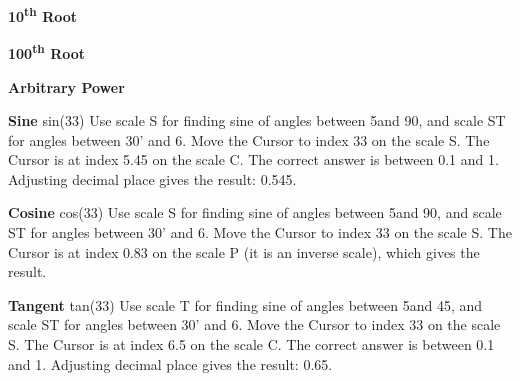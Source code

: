 \documentclass[a4paper,9pt]{article}
\begin{document}
\begin{multicols*}{3}
  \textbf{10\textsuperscript{th} Root}

  \textbf{100\textsuperscript{th} Root}

  \textbf{Arbitrary Power}

  \textbf{Sine} sin(33\textdegree)
Use scale S for finding sine of angles between 5\textdegree and 90\textdegree, and scale ST for angles between 30' and 6\textdegree.
Move the Cursor to index 33 on the scale S.
The Cursor is at index 5.45 on the scale C.
The correct answer is between 0.1 and 1. Adjusting decimal place gives the result: 0.545.

  \textbf{Cosine} cos(33\textdegree)
Use scale S for finding sine of angles between 5\textdegree and 90\textdegree, and scale ST for angles between 30' and 6\textdegree.
Move the Cursor to index 33 on the scale S.
The Cursor is at index 0.83 on the scale P (it is an inverse scale), which gives the result.

  \textbf{Tangent} tan(33\textdegree)
Use scale T for finding sine of angles between 5\textdegree and 45\textdegree, and scale ST for angles between 30' and 6\textdegree.
Move the Cursor to index 33 on the scale S.
The Cursor is at index 6.5 on the scale C.
The correct answer is between 0.1 and 1. Adjusting decimal place gives the result: 0.65.

  \end{multicols*}
  
\end{document}
